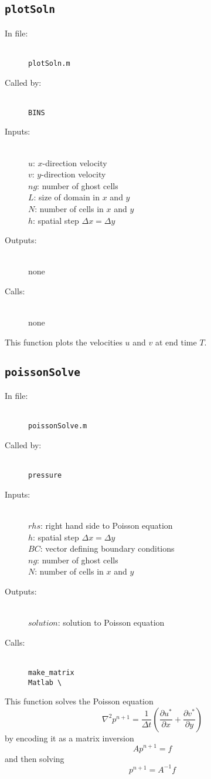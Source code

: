 \documentclass[12pt]{article}
\begin{document}
\subsection{\texttt{plotSoln}}
\begin{description}
\item[In file:] \hfill \\ \texttt{plotSoln.m}
\item[Called by:] \hfill \\ \texttt{BINS}
\item[Inputs:] \hfill \\  $u$: $x$-direction velocity \\ $v$: $y$-direction velocity\\ $ng$: number of ghost cells \\ $L$: size of domain in $x$ and $y$ \\ $N$: number of cells in $x$ and $y$ \\ $h$: spatial step $\Delta x = \Delta y$ 
\item[Outputs:] \hfill \\ none
\item[Calls:] \hfill \\ none
\end{description}
This function plots the velocities $u$ and $v$ at end time $T$.

\subsection{\texttt{poissonSolve}}
\begin{description}
\item[In file:] \hfill \\ \texttt{poissonSolve.m}
\item[Called by:] \hfill \\ \texttt{pressure}
\item[Inputs:] \hfill \\  $rhs$: right hand side to Poisson equation \\ $h$: spatial step $\Delta x = \Delta y$ \\ $BC$: vector defining boundary conditions \\ $ng$: number of ghost cells \\ $N$: number of cells in $x$ and $y$
\item[Outputs:] \hfill \\ $solution$: solution to Poisson equation
\item[Calls:] \hfill \\ \texttt{make\_matrix} \\ \texttt{Matlab \textbackslash}
\end{description}
This function solves the Poisson equation
\[ \nabla^2 p^{n+1} = \frac{1}{\Delta t}\left( \frac{\partial u^*}{\partial x} + \frac{\partial v^*}{\partial y} \right) \]
by encoding it as a matrix inversion
\[ Ap^{n+1} = f\]
and then solving
\[ p^{n+1} = A^{-1}f\]
\end{document}
